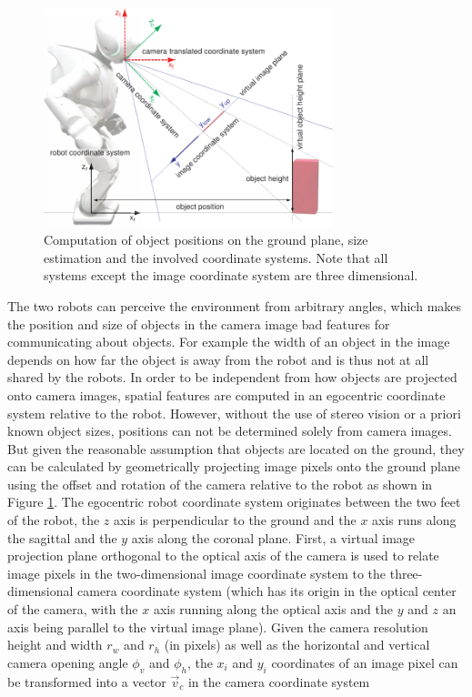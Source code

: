 \begin{figure}[t]
  \includegraphics[width=0.75\textwidth]{figures/vision-system-coordinate-systems}
  \caption{Computation of object positions on the ground plane, size
    estimation and the involved coordinate systems. Note that all
    systems except the image coordinate system are three
    dimensional. }
  \label{f:vision-system-coordinate-systems}
\end{figure}


The two robots can perceive the environment from arbitrary angles,
which makes the position and size of objects in the camera image bad
features for communicating about objects. For example the width of an
object in the image depends on how far the object is away from the
robot and is thus not at all shared by the robots. In order to be
independent from how objects are projected onto camera images, spatial
features are computed in an egocentric coordinate system relative to
the robot. However, without the use of stereo vision or a priori known
object sizes, positions can not be determined solely from camera
images. But given the reasonable assumption that objects are located
on the ground, they can be calculated by geometrically projecting
image pixels onto the ground plane using the offset and rotation of
the camera relative to the robot as shown in Figure
\ref{f:vision-system-coordinate-systems}. The egocentric robot
coordinate system originates between the two feet of the robot, the
$z$ axis is perpendicular to the ground and the $x$ axis runs along
the sagittal and the $y$ axis along the coronal plane. First, a
virtual image projection plane orthogonal to the optical axis of the
camera is used to relate image pixels in the two-dimensional image
coordinate system to the three-dimensional camera coordinate system
(which has its origin in the optical center of the camera, with the
$x$ axis running along the optical axis and the $y$ and $z$ an axis
being parallel to the virtual image plane). Given the camera
resolution height and width $r_{w}$ and $r_{h}$ (in pixels) as well as
the horizontal and vertical camera opening angle $\phi_{v}$ and
$\phi_{h}$, the $x_i$ and $y_i$ coordinates of an image pixel can be
transformed into a vector $\vec{v}_c$ in the camera coordinate system

